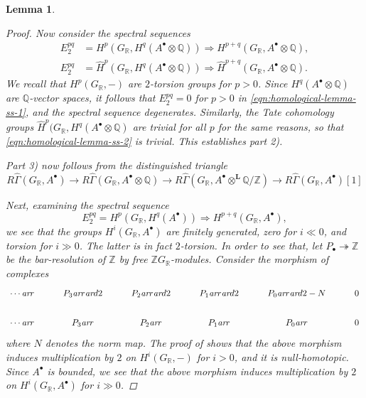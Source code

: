 \documentclass[leqno,12pt]{article}
\theoremstyle{plain}
\newtheorem{lemma}[theorem]{\indent\sc Lemma}
\theoremstyle{definition}
\newcommand{\QQ}{\mathbb{Q}}
\newcommand{\RR}{\mathbb{R}}
\newcommand{\ZZ}{\mathbb{Z}}
\newcommand{\ar}{\text{\it ar}}
\begin{document}
\begin{lemma}
\begin{proof}
    Now consider the spectral sequences
    \begin{align}
      \label{eqn:homological-lemma-ss-1} E_2^{pq} & = H^p (G_\RR, H^q (A^\bullet \otimes \QQ)) \Longrightarrow H^{p+q} (G_\RR, A^\bullet \otimes \QQ), \\
      \label{eqn:homological-lemma-ss-2} E_2^{pq} & = \widehat{H}^p (G_\RR, H^q (A^\bullet \otimes \QQ)) \Longrightarrow \widehat{H}^{p+q} (G_\RR, A^\bullet \otimes \QQ).
    \end{align}
    We recall that $H^p (G_\RR, -)$ are $2$-torsion groups for $p > 0$. Since
    $H^q (A^\bullet \otimes \QQ)$ are $\QQ$-vector spaces, it follows that
    $E_2^{pq} = 0$ for $p > 0$ in \eqref{eqn:homological-lemma-ss-1}, and the
    spectral sequence degenerates. Similarly, the Tate cohomology groups
    $\widehat{H}^p (G_\RR, H^q (A^\bullet \otimes \QQ)$ are trivial for
    \emph{all} $p$ for the same reasons, so that
    \eqref{eqn:homological-lemma-ss-2} is trivial. This establishes part 2).

    Part 3) now follows from the distinguished triangle
    \[ R\widehat{\Gamma} (G_\RR, A^\bullet) \to
      R\widehat{\Gamma} (G_\RR, A^\bullet \otimes \QQ) \to
      R\widehat{\Gamma} (G_\RR, A^\bullet \otimes^\mathbf{L} \QQ/\ZZ) \to
      R\widehat{\Gamma} (G_\RR, A^\bullet) [1] \]

    Next, examining the spectral sequence
    $$E_2^{pq} = H^p (G_\RR, H^q (A^\bullet)) \Longrightarrow H^{p+q} (G_\RR, A^\bullet),$$
    we see that the groups $H^i (G_\RR, A^\bullet)$ are finitely generated, zero
    for $i \ll 0$, and torsion for $i \gg 0$. The latter is in fact
    $2$-torsion. In order to see that, let $P_\bullet \twoheadrightarrow \ZZ$ be
    the bar-resolution of $\ZZ$ by free $\ZZ G_\RR$-modules. Consider the
    morphism of complexes
    \[ \begin{tikzcd}
        \cdots\ar{r} & P_3\ar{r}\ar{d}{2} & P_2\ar{r}\ar{d}{2} & P_1\ar{r}\ar{d}{2} & P_0\ar{r}\ar{d}{2-N} & 0 \\
        \cdots\ar{r} & P_3\ar{r} & P_2\ar{r} & P_1\ar{r} & P_0\ar{r} & 0
      \end{tikzcd} \]
    where $N$ denotes the norm map. The proof of
    \cite[Theorem~6.5.8]{Weibel-1994} shows that the above morphism induces
    multiplication by $2$ on $H^i (G_\RR,-)$ for $i > 0$, and it is
    null-homotopic. Since $A^\bullet$ is bounded, we see that the above morphism
    induces multiplication by $2$ on $H^i (G_\RR, A^\bullet)$ for $i \gg 0$.


\end{proof}
\end{lemma}
\end{document}

